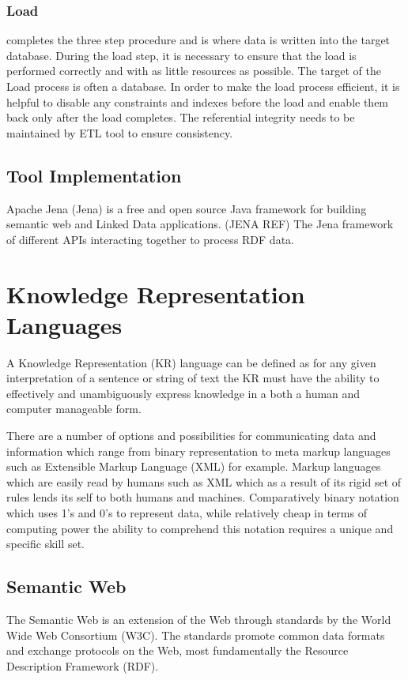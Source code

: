 \subsubsection{Load} completes the three step procedure and is where data is written into the target database. During the load step, it is necessary to ensure that the load is performed correctly and with as little resources as possible. The target of the Load process is often a database. In order to make the load process efficient, it is helpful to disable any constraints and indexes before the load and enable them back only after the load completes. The referential integrity needs to be maintained by ETL tool to ensure consistency.

\subsection{Tool Implementation}


Apache Jena (Jena) is a free and open source Java framework for building semantic web and Linked Data applications. (JENA REF) The Jena framework  of different APIs interacting together to process RDF data.

\section{Knowledge Representation Languages}
A Knowledge Representation (KR) language can be defined as for any given interpretation of a sentence or string of text the KR must have the ability to effectively and unambiguously express knowledge in a both a human and computer manageable form. 

There are a number of options and possibilities for communicating data and information which range from binary representation to meta markup languages such as Extensible Markup Language (XML) for example. Markup languages which are easily read by humans such as XML which as a result of its rigid set of rules lends its self to both humans and machines. Comparatively binary notation which uses 1's and 0's to represent data, while relatively cheap in terms of computing power the ability to comprehend this notation requires a unique and specific skill set.

\subsection{Semantic Web}
The Semantic Web is an extension of the Web through standards by the World Wide Web Consortium (W3C). The standards promote common data formats and exchange protocols on the Web, most fundamentally the Resource Description Framework (RDF).

